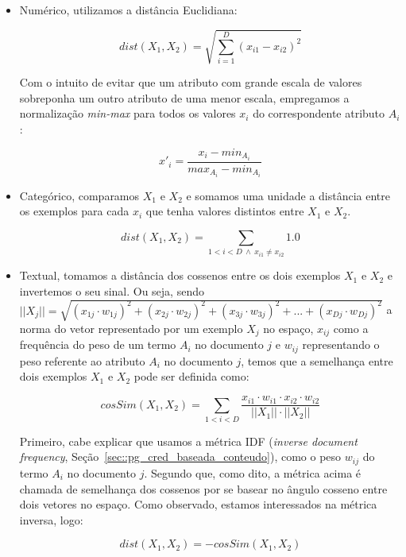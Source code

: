 \begin{itemize}

\item Numérico, utilizamos a distância Euclidiana:

\begin{equation}\label{eqn::distancia_euclidiana}
    dist(X_1, X_2) =  \sqrt{\sum_{i=1}^D (x_{i1}-x_{i2})^2}
\end{equation}

    Com o intuito de evitar que um atributo com grande escala de valores sobreponha um outro atributo de uma menor escala, empregamos a normalização \textit{min-max} para todos os valores $x_i$ do correspondente atributo $A_i$: 

\begin{equation}\label{eqn::distancia_euclidiana}
    x'_{i} =  \frac{x_{i} - min_{A_i}}{ max_{A_i} - min_{A_i} }
\end{equation}

\item Categórico, comparamos $X_1$ e $X_2$ e somamos uma unidade a distância entre os exemplos para cada $x_i$ que tenha valores distintos entre $X_1$ e $X_2$.

\begin{equation}\label{eqn::distancia_cat}
   dist(X_1, X_2) = \sum_{1 < i < D \ \wedge \ x_{i1} \neq x_{i2}} 1.0
\end{equation}

\item Textual, tomamos a distância dos cossenos entre os dois exemplos $X_1$ e $X_2$ e invertemos o seu sinal. Ou seja, sendo $||X_j|| = \sqrt{ (x_{1j} \cdot w_{1j})^2 + (x_{2j} \cdot w_{2j})^2 + (x_{3j} \cdot w_{3j})^2 + ... + (x_{Dj} \cdot w_{Dj})^2}$ a norma do vetor representado por um exemplo $X_j$ no espaço, $x_{ij}$ como a frequência do peso de um termo $A_i$ no documento $j$ e $w_{ij}$ representando o peso referente ao atributo $A_i$ no documento $j$, temos que a semelhança entre dois exemplos $X_1$ e $X_2$ pode ser definida como:

\begin{equation}\label{eqn::distancia_texto}
    cosSim(X_1, X_2) = \sum\limits_{1 < i < D} \frac{ x_{i1} \cdot w_{i1} \cdot x_{i2} \cdot w_{i2} }{ ||X_1|| \cdot ||X_2|| }
\end{equation}

Primeiro, cabe explicar que usamos a métrica \textsc{IDF} (\textit{inverse document frequency}, Seção~\ref{sec::pg_cred_baseada_conteudo}), como o peso $w_{ij}$ do termo $A_i$ no documento $j$. Segundo que, como dito, a métrica acima é chamada de semelhança dos cossenos por se basear no ângulo cosseno entre dois vetores no espaço. Como observado, estamos interessados na métrica inversa, logo:
 
 \begin{equation}\label{eqn::distancia_texto2}
    dist(X_1, X_2) = - cosSim(X_1, X_2)
\end{equation}


\end{itemize}

